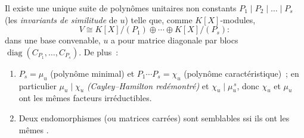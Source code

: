 \begin{theorem}
\label{thm:b3:modules:frobenius}
Il existe une unique suite de polynômes unitaires non constants
$P_1 \mid P_2 \mid \dots \mid P_s$ (les \emph{invariants de
similitude} de $u$) telle que,
comme $K[X]$-modules,
\[
V \cong K[X]/(P_1) \oplus \cdots \oplus K[X]/(P_s):
\]
dans une base convenable, $u$ a pour matrice diagonale par
blocs $\operatorname{diag}(C_{P_1}, \dots, C_{P_s})$. De plus~:
\begin{enumerate}
  \item $P_s = \mu_u$ (polynôme minimal) et $P_1\cdots P_s =
        \chi_u$ (polynôme caractéristique)~; en particulier
        $\mu_u \mid \chi_u$ \emph{(Cayley--Hamilton
        redémontré)} et $\chi_u \mid \mu_u^{\,s}$, donc $\chi_u$
        et $\mu_u$ ont les mêmes facteurs irréductibles.
  \item Deux endomorphismes (ou matrices carrées) sont
        semblables ssi ils ont les mêmes .
\end{enumerate}
\end{theorem}

